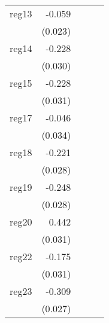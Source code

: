 {\begin{longtable}{l*{4}{D{.}{.}{-1}}}
\addlinespace
reg13       &      -0.059\sym{**} &                     &                     &                     \\
            &     (0.023)         &                     &                     &                     \\
\addlinespace
reg14       &      -0.228\sym{***}&                     &                     &                     \\
            &     (0.030)         &                     &                     &                     \\
\addlinespace
reg15       &      -0.228\sym{***}&                     &                     &                     \\
            &     (0.031)         &                     &                     &                     \\
\addlinespace
reg17       &      -0.046         &                     &                     &                     \\
            &     (0.034)         &                     &                     &                     \\
\addlinespace
reg18       &      -0.221\sym{***}&                     &                     &                     \\
            &     (0.028)         &                     &                     &                     \\
\addlinespace
reg19       &      -0.248\sym{***}&                     &                     &                     \\
            &     (0.028)         &                     &                     &                     \\
\addlinespace
reg20       &       0.442\sym{***}&                     &                     &                     \\
            &     (0.031)         &                     &                     &                     \\
\addlinespace
reg22       &      -0.175\sym{***}&                     &                     &                     \\
            &     (0.031)         &                     &                     &                     \\
\addlinespace
reg23       &      -0.309\sym{***}&                     &                     &                     \\
            &     (0.027)         &                     &                     &                     \\

\end{longtable}}
